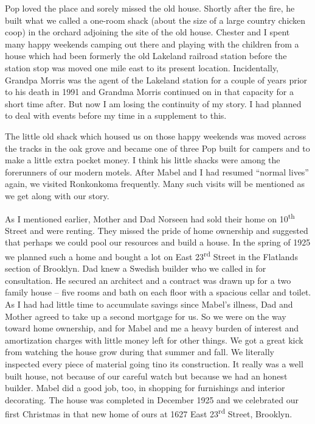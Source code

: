 \documentclass[12pt]{book}              %
\begin{document}
Pop loved the place and sorely missed the old house. Shortly after the fire, he built what we called a one-room shack (about the size of a large country chicken coop) in the orchard adjoining the site of the old house. Chester and I spent many happy weekends camping out there and playing with the children from a house which had been formerly the old Lakeland railroad station before the station stop was moved one mile east to its present location. Incidentally, Grandpa Morris was the agent of the Lakeland station for a couple of years prior to his death in 1991 and Grandma Morris continued on in that capacity for a short time after. But now I am losing the continuity of my story. I had planned to deal with events before my time in a supplement to this. 

The little old shack which housed us on those happy weekends was moved across the tracks in the oak grove and became one of three Pop built for campers and to make a little extra pocket money. I think his little shacks were among the forerunners of our modern motels. After Mabel and I had resumed ``normal lives'' again, we visited Ronkonkoma frequently. Many such visits will be mentioned as we get along with our story.

As I mentioned earlier, Mother and Dad Norseen had sold their home on 10\textsuperscript{th} Street and were renting. They missed the pride of home ownership and suggested that perhaps we could pool our resources and build a house. In the spring of 1925 we planned such a home and bought a lot on East 23\textsuperscript{rd} Street in the Flatlands section of Brooklyn. Dad knew a Swedish builder who we called in for consultation. He secured an architect and a contract was drawn up for a two family house -- five rooms and bath on each floor with a spacious cellar and toilet. As I had had little time to accumulate savings since Mabel's illness, Dad and Mother agreed to take up a second mortgage for us. So we were on the way toward home ownership, and for Mabel and me a heavy burden of interest and amortization charges with little money left for other things. We got a great kick from watching the house grow during that summer and fall. We literally inspected every piece of material going tino its construction. It really was a well built house, not because of our careful watch but because we had an honest builder. Mabel did a good job, too, in shopping for furnishings and interior decorating. The house was completed in December 1925 and we celebrated our first Christmas in that new home of ours at 1627 East 23\textsuperscript{rd} Street, Brooklyn. 
\end{document}
